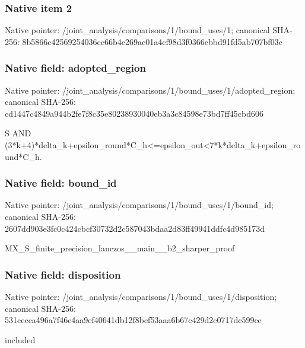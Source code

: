 \documentclass[10pt,a4paper]{article}
\begin{document}
\subsubsection{Native item 2}
Native pointer: /joint\_\allowbreak{}analysis/comparisons/1/bound\_\allowbreak{}uses/1; canonical SHA-256: 8b5866c42569254036ce66b4c269ac01a4cf98d3f0366ebbd91fd5ab707bf03c

\subsubsection{Native field: adopted\_\allowbreak{}region}
Native pointer: /joint\_\allowbreak{}analysis/comparisons/1/bound\_\allowbreak{}uses/1/adopted\_\allowbreak{}region; canonical SHA-256: cd1447c4849a944b2fe7f8c35e80238930040eb3a3c84598e73bd7ff45cbd606

\begingroup\raggedright\sloppy S AND (3*k+4)*delta\_\allowbreak{}k+epsilon\_\allowbreak{}round*C\_\allowbreak{}h<=\allowbreak{}epsilon\_\allowbreak{}out<7*k*delta\_\allowbreak{}k+epsilon\_\allowbreak{}round*C\_\allowbreak{}h.\par\endgroup

\subsubsection{Native field: bound\_\allowbreak{}id}
Native pointer: /joint\_\allowbreak{}analysis/comparisons/1/bound\_\allowbreak{}uses/1/bound\_\allowbreak{}id; canonical SHA-256: 2607dd903e3fc0c424cbcf30732d2c587043bdaa2d83ff49941ddfc4d985173d

\begingroup\raggedright\sloppy MX\_\allowbreak{}S\_\allowbreak{}finite\_\allowbreak{}precision\_\allowbreak{}lanczos\_\allowbreak{}\_\allowbreak{}main\_\allowbreak{}\_\allowbreak{}b2\_\allowbreak{}sharper\_\allowbreak{}proof\par\endgroup

\subsubsection{Native field: disposition}
Native pointer: /joint\_\allowbreak{}analysis/comparisons/1/bound\_\allowbreak{}uses/1/disposition; canonical SHA-256: 531cecca496a7f46e4aa9ef40641db12f8bef53aaa6b67c429d2c0717dc599ce

\begingroup\raggedright\sloppy included\par\endgroup
\end{document}
